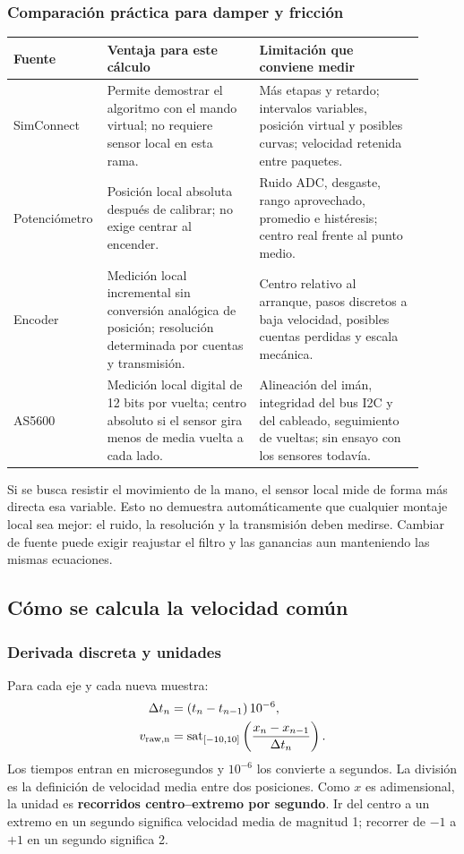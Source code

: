 \subsubsection{Comparación práctica para damper y fricción}
\begin{longtable}{p{0.16\linewidth}p{0.36\linewidth}p{0.39\linewidth}}
\toprule
Fuente & Ventaja para este cálculo & Limitación que conviene medir\\
\midrule
SimConnect & Permite demostrar el algoritmo con el mando virtual; no requiere sensor local en esta rama. & Más etapas y retardo; intervalos variables, posición virtual y posibles curvas; velocidad retenida entre paquetes.\\
Potenciómetro & Posición local absoluta después de calibrar; no exige centrar al encender. & Ruido ADC, desgaste, rango aprovechado, promedio e histéresis; centro real frente al punto medio.\\
Encoder & Medición local incremental sin conversión analógica de posición; resolución determinada por cuentas y transmisión. & Centro relativo al arranque, pasos discretos a baja velocidad, posibles cuentas perdidas y escala mecánica.\\
AS5600 & Medición local digital de 12 bits por vuelta; centro absoluto si el sensor gira menos de media vuelta a cada lado. & Alineación del imán, integridad del bus I2C y del cableado, seguimiento de vueltas; sin ensayo con los sensores todavía.\\
\bottomrule
\end{longtable}
Si se busca resistir el movimiento de la mano, el sensor local mide de forma más directa esa variable. Esto no demuestra automáticamente que cualquier montaje local sea mejor: el ruido, la resolución y la transmisión deben medirse. Cambiar de fuente puede exigir reajustar el filtro y las ganancias aun manteniendo las mismas ecuaciones.

\subsection{Cómo se calcula la velocidad común}
\label{sec:velocidad_comun}
\subsubsection{Derivada discreta y unidades}
Para cada eje y cada nueva muestra:
\begin{align}
\Delta t_n&=(t_n-t_{n-1})\,10^{-6},\\
v_{\rm raw,n}&=\operatorname{sat}_{[-10,10]}\left(\frac{x_n-x_{n-1}}{\Delta t_n}\right).
\end{align}
Los tiempos entran en microsegundos y $10^{-6}$ los convierte a segundos. La división es la definición de velocidad media entre dos posiciones. Como $x$ es adimensional, la unidad es \textbf{recorridos centro--extremo por segundo}. Ir del centro a un extremo en un segundo significa velocidad media de magnitud 1; recorrer de $-1$ a $+1$ en un segundo significa 2.


